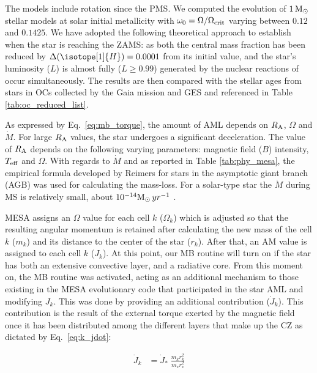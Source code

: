 \documentclass[fleqn,usenatbib]{mnras}
\begin{document}
The models include rotation since the PMS. We computed the evolution of $1\,\mathrm{M}_\odot$ stellar models at solar initial metallicity with $\omega_{\mathrm{0}} = \Omega / \Omega_{\mathrm{crit}}$ varying between $0.12$ and $0.1425$. We have adopted the following theoretical approach to establish when the star is reaching the ZAMS: as both the central  mass fraction has been reduced by $\Delta( \isotope[1]{H})= 0.0001$ from its initial value, and the star's luminosity ($L$) is almost fully ($L \geq 0.99$) generated by the nuclear reactions of  occur simultaneously. The results are then compared with the stellar ages from stars in OCs collected by the Gaia mission and GES and referenced in Table \ref{tab:oc_reduced_list}.\par

As expressed by Eq.~\ref{eq:mb_torque}, the amount of AML depends on $R_{\mathrm{A}}$, $\Omega$ and $\Dot{M}$. For large $R_{\mathrm{A}}$ values, the star undergoes a significant deceleration. The value of $R_{\mathrm{A}}$ depends on the following varying parameters: magnetic field ($B$) intensity, $T_{\mathrm{eff}}$ and $\Omega$. With regards to $\Dot{M}$ and as reported in Table \ref{tab:phy_mesa}, the empirical formula developed by Reimers \citep{Reimers1975} for stars in the asymptotic giant branch (AGB) was used for calculating the mass-loss. For a solar-type star the $\Dot{M}$ during MS is relatively small, about  $10^{-14}\mathrm{M}_\odot \, yr^{-1}$ \citep{Noerdlinger2008}. \par

MESA assigns an $\Omega$ value for each cell $k$ ($\Omega_k$) which is adjusted so that the resulting angular momentum is retained after calculating the new mass of the cell $k$ ($m_k$) and its distance to the center of the star ($r_k$). After that, an AM value is assigned to each cell $k$ ($J_k$). At this point, our MB routine will turn on if the star has both an extensive convective layer, and a radiative core. From this moment on, the MB routine was activated, acting as an additional mechanism to those existing in the MESA evolutionary code that participated in the star AML and modifying $J_k$. This was done by providing an additional contribution ($\Dot{J}_{k}$). This contribution is the result of the external torque exerted by the magnetic field once it has been distributed among the different layers that make up the CZ as dictated by Eq.~\ref{eq:k_jdot}:\par
 
\begin{ceqn}
\begin{align}
    \Dot{J}_{k} &= \Dot{J}_*\;\frac{m^{}_{k} r^2_{k}}{m^{}_* r_*^2} \label{eq:k_jdot}
\end{align}
\end{ceqn}
\end{document}
